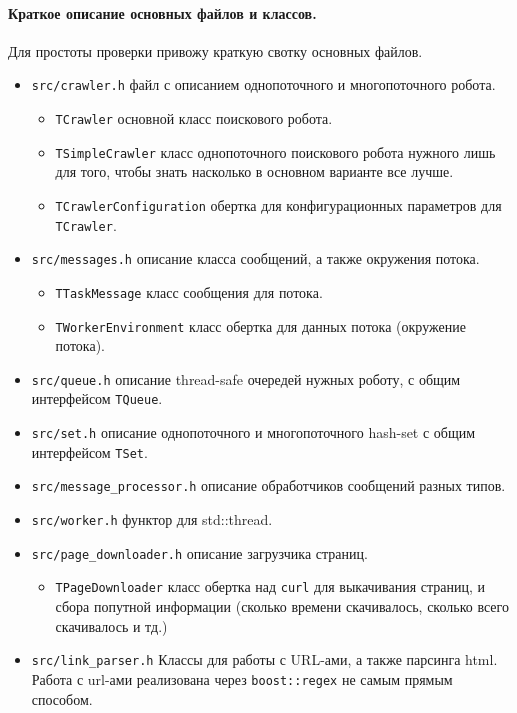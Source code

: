 \documentclass[12pt]{article}
\begin{document}
\paragraph{Краткое описание основных файлов и классов.} Для простоты проверки
привожу краткую свотку основных файлов.
\begin{itemize}
    \item \verb|src/crawler.h| файл с описанием однопоточного и многопоточного робота.
    \begin{itemize}
        \item \verb|TCrawler| основной класс поискового робота.
        \item \verb|TSimpleCrawler| класс однопоточного поискового робота нужного лишь
              для того, чтобы знать насколько в основном варианте все лучше.
        \item \verb|TCrawlerConfiguration| обертка для конфигурационных параметров для
              \verb|TCrawler|.
    \end{itemize}

    \item \verb|src/messages.h| описание класса сообщений, а также окружения потока.
    \begin{itemize}
        \item \verb|TTaskMessage| класс сообщения для потока.
        \item \verb|TWorkerEnvironment| класс обертка для данных потока (окружение потока).
    \end{itemize}

    \item \verb|src/queue.h| описание thread-safe очередей нужных роботу, с общим интерфейсом
          \verb|TQueue|.
    \item \verb|src/set.h| описание однопоточного и многопоточного hash-set с общим интерфейсом
          \verb|TSet|.

    \item \verb|src/message_processor.h| описание обработчиков сообщений разных типов.
    \item \verb|src/worker.h| функтор для std::thread.
    \item \verb|src/page_downloader.h| описание загрузчика страниц.
    \begin{itemize} 
        \item \verb|TPageDownloader| класс обертка над \verb|curl| для выкачивания страниц,
              и сбора попутной информации (сколько времени скачивалось, сколько всего скачивалось
              и тд.)
    \end{itemize}

    \item \verb|src/link_parser.h| Классы для работы с URL-ами, а также парсинга html.
          Работа с url-ами реализована через \verb|boost::regex| не самым прямым способом.

\end{itemize}
\end{document}
